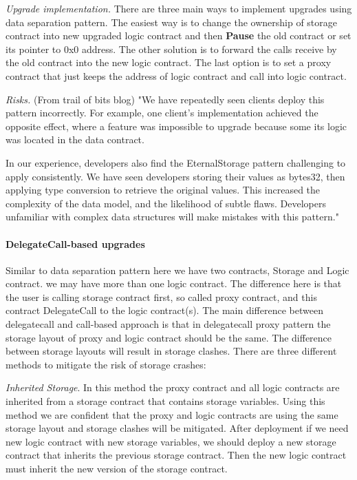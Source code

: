\textit{Upgrade implementation. } There are three main ways to implement upgrades using data separation pattern. The easiest way is to change the ownership of storage contract into new upgraded logic contract and then \textbf{Pause} the old contract or set its pointer to 0x0 address. The other solution is to forward the calls receive by the old contract into the new logic contract. The last option is to set a proxy contract that just keeps the address of logic contract and call into logic contract.

\textit{Risks. } (From trail of bits blog)
"We have repeatedly seen clients deploy this pattern incorrectly. For example, one client’s implementation achieved the opposite effect, where a feature was impossible to upgrade because some its logic was located in the data contract.

In our experience, developers also find the EternalStorage pattern challenging to apply consistently. We have seen developers storing their values as bytes32, then applying type conversion to retrieve the original values. This increased the complexity of the data model, and the likelihood of subtle flaws. Developers unfamiliar with complex data structures will make mistakes with this pattern."


\paragraph{DelegateCall-based upgrades}
Similar to data separation pattern here we have two contracts, Storage and Logic contract. we may have more than one logic contract. The difference here is that the user is calling storage contract first, so called proxy contract, and this contract DelegateCall to the logic contract(s).
The main difference between delegatecall and call-based approach is that in delegatecall proxy pattern the storage layout of proxy and logic contract should be the same. The difference between storage layouts will result in storage clashes. 
There are three different methods to mitigate the risk of storage crashes:

\textit{Inherited Storage}. 
In this method the proxy contract and all logic contracts are inherited from a storage contract that contains storage variables. Using this method we are confident that the proxy and logic contracts are using the same storage layout and storage clashes will be mitigated.
After deployment if we need new logic contract with new storage variables, we should deploy a new storage contract that inherits the previous storage contract. Then the new logic contract must inherit the new version of the storage contract.

